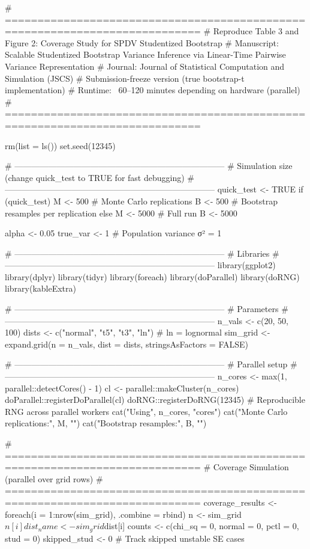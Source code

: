 # ============================================================================
# Reproduce Table 3 and Figure 2: Coverage Study for SPDV Studentized Bootstrap
# Manuscript: Scalable Studentized Bootstrap Variance Inference via Linear-Time Pairwise Variance Representation
# Journal: Journal of Statistical Computation and Simulation (JSCS)
# Submission-freeze version (true bootstrap-t implementation)
# Runtime: ~60–120 minutes depending on hardware (parallel)
# ============================================================================

rm(list = ls())
set.seed(12345)

# ---------------------------------------------------------------------------
# Simulation size (change quick_test to TRUE for fast debugging)
# ---------------------------------------------------------------------------
quick_test <- TRUE
if (quick_test) {
  M <- 500     # Monte Carlo replications
  B <- 500     # Bootstrap resamples per replication
} else {
  M <- 5000    # Full run
  B <- 5000
}

alpha <- 0.05
true_var <- 1  # Population variance σ² = 1

# ---------------------------------------------------------------------------
# Libraries
# ---------------------------------------------------------------------------
library(ggplot2)
library(dplyr)
library(tidyr)
library(foreach)
library(doParallel)
library(doRNG)
library(kableExtra)

# ---------------------------------------------------------------------------
# Parameters
# ---------------------------------------------------------------------------
n_vals <- c(20, 50, 100)
dists <- c("normal", "t5", "t3", "ln")  # ln = lognormal
sim_grid <- expand.grid(n = n_vals, dist = dists, stringsAsFactors = FALSE)

# ---------------------------------------------------------------------------
# Parallel setup
# ---------------------------------------------------------------------------
n_cores <- max(1, parallel::detectCores() - 1)
cl <- parallel::makeCluster(n_cores)
doParallel::registerDoParallel(cl)
doRNG::registerDoRNG(12345)  # Reproducible RNG across parallel workers
cat("Using", n_cores, "cores\n")
cat("Monte Carlo replications:", M, "\n")
cat("Bootstrap resamples:", B, "\n\n")

# ============================================================================
# Coverage Simulation (parallel over grid rows)
# ============================================================================
coverage_results <- foreach(i = 1:nrow(sim_grid), .combine = rbind) %
  n <- sim_grid$n[i]
  dist_name <- sim_grid$dist[i]
  counts <- c(chi_sq = 0, normal = 0, pctl = 0, stud = 0)
  skipped_stud <- 0  # Track skipped unstable SE cases

